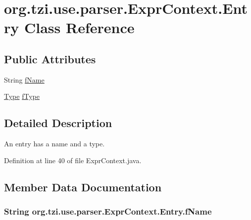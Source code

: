 \hypertarget{classorg_1_1tzi_1_1use_1_1parser_1_1_expr_context_1_1_entry}{\section{org.\-tzi.\-use.\-parser.\-Expr\-Context.\-Entry Class Reference}
\label{classorg_1_1tzi_1_1use_1_1parser_1_1_expr_context_1_1_entry}
}
\subsection*{Public Attributes}
\begin{DoxyCompactItemize}
\item 
String \hyperlink{classorg_1_1tzi_1_1use_1_1parser_1_1_expr_context_1_1_entry_a24d041db2cc16df03ce985cbeab520eb}{f\-Name}
\item 
\hyperlink{interfaceorg_1_1tzi_1_1use_1_1uml_1_1ocl_1_1type_1_1_type}{Type} \hyperlink{classorg_1_1tzi_1_1use_1_1parser_1_1_expr_context_1_1_entry_a24ad863d12be018375d7c9dc6f00c3a9}{f\-Type}
\end{DoxyCompactItemize}


\subsection{Detailed Description}
An entry has a name and a type. 

Definition at line 40 of file Expr\-Context.\-java.



\subsection{Member Data Documentation}
\hypertarget{classorg_1_1tzi_1_1use_1_1parser_1_1_expr_context_1_1_entry_a24d041db2cc16df03ce985cbeab520eb}{
\subsubsection[{f\-Name}]{\setlength{\rightskip}{0pt plus 5cm}String org.\-tzi.\-use.\-parser.\-Expr\-Context.\-Entry.\-f\-Name}}\label{classorg_1_1tzi_1_1use_1_1parser_1_1_expr_context_1_1_entry_a24d041db2cc16df03ce985cbeab520eb}


